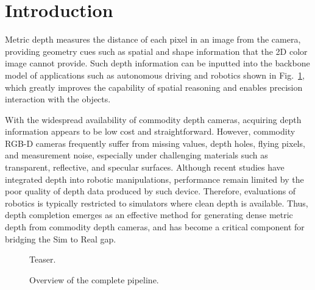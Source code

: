 \section{Introduction}
\label{sec:introduction}

Metric depth measures the distance of each pixel in an image from the camera, 
providing geometry cues such as spatial and shape information that the 2D color 
image cannot provide. 
Such depth information can be inputted into the backbone model of 
applications such as autonomous driving and robotics shown in Fig.~\ref{fig:teaser},
which greatly improves
the capability of spatial reasoning and enables precision interaction
with the objects.

With the widespread availability of commodity depth cameras, acquiring depth information appears to be low cost and straightforward. 
However, commodity RGB-D cameras frequently suffer from missing values, 
depth holes, flying pixels, and measurement noise, 
especially under challenging materials such as transparent, 
reflective, and specular surfaces. 
Although recent studies have integrated depth into robotic manipulations, performance remain limited by the poor quality of depth data produced by such device. Therefore, evaluations of robotics is typically restricted to simulators where clean depth is available. 
Thus, depth completion emerges as an effective method for generating dense metric depth from commodity depth cameras, and has become a critical component for bridging the Sim to Real gap.

\begin{figure}[t]
  \centering
  \caption{Teaser. \pending}
  \label{fig:teaser}
\end{figure}

\begin{figure}[t]
  \centering
  \caption{Overview of the complete \system{} pipeline. \pending}
  \label{fig:pipeline}
\end{figure}

